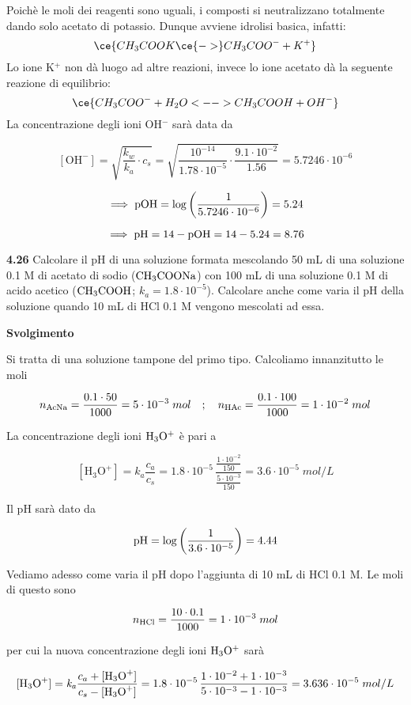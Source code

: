 Poichè le moli dei reagenti sono uguali, i composti si neutralizzano totalmente dando solo acetato di potassio. Dunque avviene idrolisi basica, infatti:
$$\ce{CH_3COOK \ce{->} CH_3COO^- + K^+}$$
Lo ione K$^+$ non dà luogo ad altre reazioni, invece lo ione acetato dà la seguente reazione di equilibrio:
$$\ce{CH_3COO^- + H_2O <--> CH_3COOH + OH^-}$$
La concentrazione degli ioni OH$^-$ sarà data da 

$$[\text{OH}^-]
=\sqrt{\frac{k_w}{k_a}\cdot c_s}
=\sqrt{\frac{10^{-14}}{1.78 \cdot 10^{-5}} \cdot \frac{9.1\cdot 10^{-2}}{1.56}}
=5.7246 \cdot 10^{-6}$$

$$\implies \rm pOH
=\log{\left(\frac{1}{5.7246 \cdot 10^{-6}}\right)}
=5.24$$

$$\implies \rm pH=14-pOH=14-5.24=8.76$$

\vspace{0.2cm}\textbf{4.26} Calcolare il pH di una soluzione formata mescolando 50 mL di una soluzione 0.1 M di acetato di sodio ($\rm CH_3COONa$) con 100 mL di una soluzione 0.1 M di acido acetico ($\rm CH_3COOH$; $k_a=1.8 \cdot 10^{-5}$). Calcolare anche come varia il pH della soluzione quando 10 mL di HCl 0.1 M vengono mescolati ad essa.

\vspace{0.2cm}\large\textbf{Svolgimento}\normalsize

Si tratta di una soluzione tampone del primo tipo. Calcoliamo innanzitutto le moli

$$n_{\rm AcNa}=\frac{0.1 \cdot 50}{1000}= 5 \cdot 10^{-3} \; mol
\quad;\quad
n_{\rm HAc}=\frac{0.1 \cdot 100}{1000}=1 \cdot 10^{-2} \; mol$$

La concentrazione degli ioni $\rm H_3O^+$ è pari a

$$[\text{H}_3\text{O}^+]=k_a\frac{c_a}{c_s}
=1.8 \cdot 10^{-5}\,\frac{\frac{1 \cdot 10^{-2}}{150}}{\frac{5 \cdot 10^{-3}}{150}}=3.6 \cdot 10^{-5} \; mol/L$$

Il pH sarà dato da

$$\rm pH=\log{\left(\frac{1}{3.6 \cdot 10^{-5}}\right)}=4.44$$

Vediamo adesso come varia il pH dopo l'aggiunta di 10 mL di HCl 0.1 M. Le moli di questo sono

$$n_{\rm HCl}=\frac{10 \cdot 0.1}{1000}=1 \cdot 10^{-3} \; mol$$

per cui la nuova concentrazione degli ioni $\rm H_3O^+$ sarà

$${[\text{H}_3\text{O}^+]}=\textit{k}_\textit{a} \frac{c_a + \rm{[\text{H}_3\text{O}^+]}}{c_s - \rm{[\text{H}_3\text{O}^+]}}
=1.8 \cdot 10^{-5} \, \frac{1 \cdot 10^{-2} + 1 \cdot 10^{-3}}{5 \cdot 10^{-3} - 1 \cdot 10^{-3}}
=3.636 \cdot 10^{-5} \; mol/L$$

